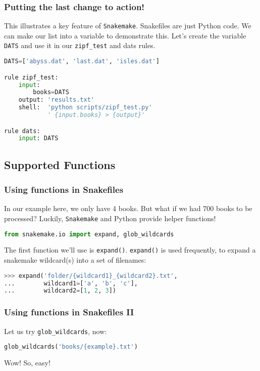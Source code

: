 \begin{frame}[fragile]
  \frametitle{Putting the last change to action!}
  This illustrates a key feature of \texttt{Snakemake}. Snakefiles are just Python code. We can make our list into a variable to demonstrate this. Let’s create the variable \texttt{DATS} and use it in our \texttt{zipf\_test} and dats rules.

  \begin{lstlisting}[language=Python,style=Python]
DATS=['abyss.dat', 'last.dat', 'isles.dat']

rule zipf_test:
    input:
        books=DATS
    output: 'results.txt'
    shell:  'python scripts/zipf_test.py'
            ' {input.books} > {output}'

rule dats:
    input: DATS
  \end{lstlisting}
\end{frame}

\subsection{Supported Functions}

\begin{frame}[fragile]
  \frametitle{Using functions in Snakefiles}
  In our example here, we only have 4 books. But what if we had 700 books to be processed? \newline
  Luckily, \texttt{Snakemake} and Python provide helper functions!
  \begin{lstlisting}[language=Python,style=Python]
from snakemake.io import expand, glob_wildcards
  \end{lstlisting}
  The first function we’ll use is \texttt{expand()}. \texttt{expand()} is used frequently, to expand a snakemake wildcard(s) into a set of filenames:
  \begin{lstlisting}[language=Python,style=Python]
>>> expand('folder/{wildcard1}_{wildcard2}.txt',
...        wildcard1=['a', 'b', 'c'],
...        wildcard2=[1, 2, 3])
  \end{lstlisting}
\end{frame}

\begin{frame}[fragile]
  \frametitle{Using functions in Snakefiles II}
  \pause
  \pause
  Let us try \texttt{glob\_wildcards}, now:
  \begin{lstlisting}[language=Python,style=Python]
glob_wildcards('books/{example}.txt')
  \end{lstlisting}
  \pause
  Wow! So, easy!
\end{frame}

